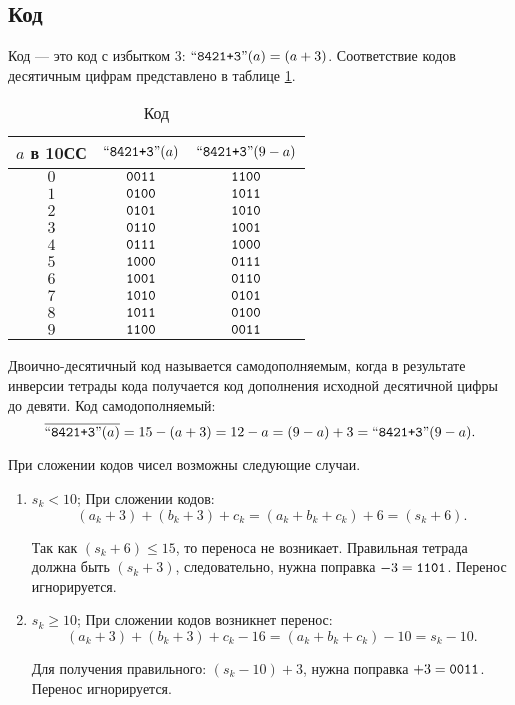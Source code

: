 \subsection{Код \PlusThreeLabel}

Код \PlusThreeLabel --- это код с избытком 3: $\text{``\texttt{8421+3}''}(a)=(a+3)$. Соответствие кодов десятичным цифрам представлено в таблице \ref{t:bcd:PlusThree}. 
    
\begin{table}[!ht]
    \caption{Код \PlusThreeLabel}
    \label{t:bcd:PlusThree}
    \centering
    \begin{tabular}{|c|c|c|}
        \hline\hline
        $a$ в 10СС  & $\text{``\texttt{8421+3}''}(a)$  & $\text{``\texttt{8421+3}''}(9-a)$\\
        \hline\hline
        $0$         & $\texttt{0011}$  & $\texttt{1100}$ \\
        $1$         & $\texttt{0100}$  & $\texttt{1011}$ \\
        $2$         & $\texttt{0101}$  & $\texttt{1010}$ \\
        $3$         & $\texttt{0110}$  & $\texttt{1001}$ \\
        $4$         & $\texttt{0111}$  & $\texttt{1000}$ \\
        $5$         & $\texttt{1000}$  & $\texttt{0111}$ \\
        $6$         & $\texttt{1001}$  & $\texttt{0110}$ \\
        $7$         & $\texttt{1010}$  & $\texttt{0101}$ \\
        $8$         & $\texttt{1011}$  & $\texttt{0100}$ \\
        $9$         & $\texttt{1100}$  & $\texttt{0011}$ \\
        \hline
    \end{tabular}
\end{table}

Двоично-десятичный код называется самодополняемым, когда в результате инверсии тетрады кода получается код дополнения исходной десятичной цифры до девяти. Код {\PlusThreeLabel} самодополняемый:
\[
    \overline{\text{``\texttt{8421+3}''}(a)}=15-(a+3)=12-a=(9-a)+3=\text{``\texttt{8421+3}''}(9-a).
\]

При сложении кодов чисел возможны следующие случаи.

\begin{enumerate}
    \item $s_k<10$; При сложении кодов: \[(a_k+3)+(b_k+3)+c_k=(a_k+b_k+c_k)+6=(s_k+6).\] 

    Так как $(s_k+6)\leq 15$, то переноса не возникает. Правильная тетрада должна быть $(s_k+3)$, следовательно, нужна поправка $-3=\texttt{1101}$. Перенос игнорируется.
    
    \item $s_k\geq 10$; При сложении кодов возникнет перенос:
    \[(a_k+3)+(b_k+3)+c_k-16=(a_k+b_k+c_k)-10=s_k-10.\] 

    Для получения правильного: $(s_k-10)+3$, нужна поправка $+3=\texttt{0011}$. Перенос игнорируется.
\end{enumerate}


